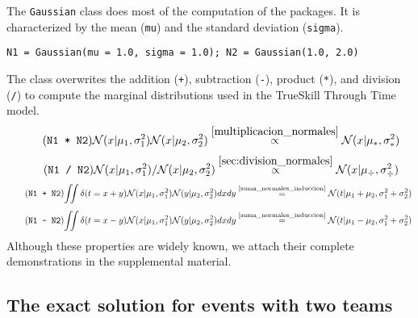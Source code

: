 \documentclass[article]{jss}
\newcommand{\N}{\mathcal{N}}
\begin{document}
The \texttt{Gaussian} class does most of the computation of the packages. 
It is characterized by the mean (\texttt{mu}) and the standard deviation (\texttt{sigma}). 
%
\begin{lstlisting}[captionpos=b,backgroundcolor=\color{all},label=lst:N1_N2, caption={Initialization of Gaussian distributions.}, belowskip=0cm]
N1 = Gaussian(mu = 1.0, sigma = 1.0); N2 = Gaussian(1.0, 2.0)  
\end{lstlisting}
The class overwrites the addition (\texttt{+}), subtraction (\texttt{-}), product (\texttt{*}), and division (\texttt{/}) to compute the marginal distributions used in the TrueSkill Through Time model. 
%
\begin{equation*} \tag{\texttt{N1 * N2}}
 \N(x|\mu_1,\sigma_1^2)\N(x|\mu_2,\sigma_2^2) \overset{\ref{multiplicacion_normales}}{\propto} \N(x|\mu_{*},\sigma_{*}^2)
\end{equation*}
%
\begin{equation*} \tag{\texttt{N1 / N2}}
 \N(x|\mu_1,\sigma_1^2)/\N(x|\mu_2,\sigma_2^2)  \overset{\ref{sec:division_normales}}{\propto} \N(x|\mu_{\div},\sigma_{\div}^2)
\end{equation*} 
%
\vspace{-0.3cm}
%
\begin{equation*} \tag{\texttt{N1 + N2}} \label{eq:suma_normales}
\begin{split}
\iint \delta(t=x + y) \N(x|\mu_1, \sigma_1^2)\N(y|\mu_2, \sigma_2^2) dxdy \overset{\text{\ref{suma_normales_induccion}}}{=} \N(t|\mu_1+\mu_2,\sigma_1^2 + \sigma_2^2)
\end{split}
\end{equation*}
%
\vspace{-0.5cm}
%
\begin{equation*} \tag{\texttt{N1 - N2}} \label{eq:resta_normales}
\begin{split}
\iint \delta(t = x - y) \N(x|\mu_1, \sigma_1^2)\N(y|\mu_2, \sigma_2^2) dxdy \overset{\text{\ref{suma_normales_induccion}}}{=} \N(t|\mu_1 - \mu_2,\sigma_1^2 + \sigma_2^2)
\end{split}
\end{equation*}
%
Although these properties are widely known, we attach their complete demonstrations in the supplemental material. 

\subsection{The exact solution for events with two teams}\label{sec:2vs2}
\end{document}
